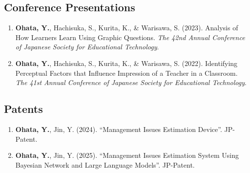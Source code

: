 \documentclass[letterpaper,10.5pt]{article}
\begin{document}
\subsection*{Conference Presentations}
\begin{enumerate}[label=\textbf{P\arabic*}, leftmargin=35pt]
  \item \textbf{Ohata, Y.}, Hachisuka, S., Kurita, K., \& Warisawa, S. (2023). Analysis of How Learners Learn Using Graphic Questions. \textit{The 42nd Annual Conference of Japanese Society for Educational Technology}.
  \item \textbf{Ohata, Y.}, Hachisuka, S., Kurita, K., \& Warisawa, S. (2022). Identifying Perceptual Factors that Influence Impression of a Teacher in a Classroom. \textit{The 41st Annual Conference of Japanese Society for Educational Technology}.
\end{enumerate}\vspace{2pt}
\subsection*{Patents}
\begin{enumerate}[label=\textbf{T\arabic*}, leftmargin=35pt]
  \item \textbf{Ohata, Y.}, Jin, Y. (2024). ``Management Issues Estimation Device''. JP-Patent.
  \item \textbf{Ohata, Y.}, Jin, Y. (2025). ``Management Issues Estimation System Using Bayesian Network and Large Language Models''. JP-Patent.
\end{enumerate}\vspace{3pt}
\end{document}
